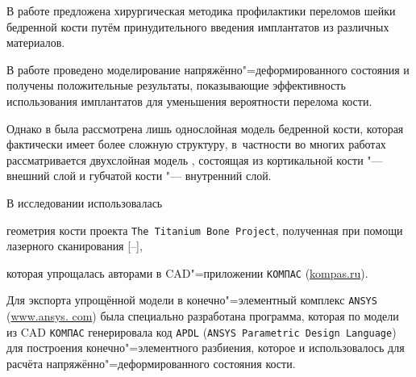 \date{01/VII/2013} %







\maketitle






В работе \cite{nekh:b1} предложена хирургическая методика профилактики переломов шейки бедренной кости путём принудительного введения имплантатов из различных материалов.



В работе \cite{nekh:b2} проведено моделирование напряжённо"=деформированного состояния и получены положительные результаты, показывающие эффективность использования имплантатов для уменьшения вероятности перелома кости. 

Однако в \cite{nekh:b2} была рассмотрена лишь однослойная модель бедренной кости, которая фактически имеет более сложную структуру, в~частности во многих работах рассматривается двухслойная модель \cite{nekh:b3, nekh:b4}, состоящая из кортикальной кости "--- внешний слой и губчатой кости "--- внутренний слой.



В исследовании \cite{nekh:b2} использовалась %

геометрия кости проекта {\tt The Titanium Bone Project}, полученная при помощи лазерного сканирования [--],  

которая упрощалась авторами в CAD"=приложении {\tt КОМПАС} (\href{http://kompas.ru/}{kompas.ru}).

Для экспорта упрощённой модели в конечно"=элементный комплекс {\tt ANSYS} (\href{http://www.ansys.com}{www.ansys. com}) была специально разработана программа, которая по модели из CAD {\tt КОМПАС} генерировала код {\tt APDL} ({\tt ANSYS Parametric Design Language}) для построения конечно"=элементного разбиения, которое и использовалось для расчёта напряжённо"=деформированного состояния кости. 




